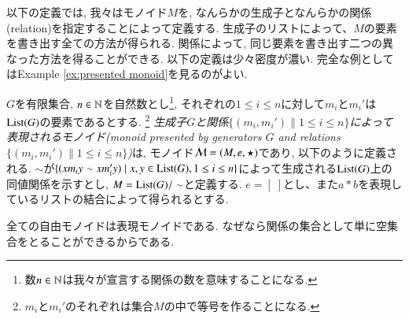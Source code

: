 以下の定義では, 我々はモノイド$M$を, なんらかの生成子となんらかの関係(relation)を指定することによって定義する. 生成子のリストによって、$M$の要素を書き出す全ての方法が得られる. 関係によって, 同じ要素を書き出す二つの異なった方法を得ることができる. 以下の定義は少々密度が濃い. 完全な例としてはExample \ref{ex:presented monoid}を見るのがよい. 

\begin{definition}\label{def:presented monoid}


$G$を有限集合, $n\in{\mathbb N}$を自然数とし\footnote{数$n\in{\mathbb N}$は我々が宣言する関係の数を意味することになる.}, それぞれの$1\leq i\leq n$に対して$m_i$と$m_i'$は$\List(G)$の要素であるとする. \footnote{$m_i$と$m_i'$のそれぞれは集合$M$の中で等号を作ることになる.} \emph{生成子$G$と関係$\{(m_i,m_i')\|1\leq i\leq n\}$によって表現されるモノイド(monoid presented by generators $G$ and relations $\{(m_i,m_i')\|1\leq i\leq n\}$)}は, モノイド$\mathcal{M}=(M,e,\star)$であり, 以下のように定義される. $\sim$が$\{(xm_iy\sim xm_i'y)\|x,y\in\List(G), 1\leq i\leq n\}$によって生成される$\List(G)$上の同値関係を示すとし, $M=\List(G)/\sim$と定義する. $e=[\;]$とし、また$a * b$を表現しているリストの結合によって得られるとする.

\end{definition}

\begin{remark}


全ての自由モノイドは表現モノイドである. なぜなら関係の集合として単に空集合をとることができるからである.

\end{remark}

